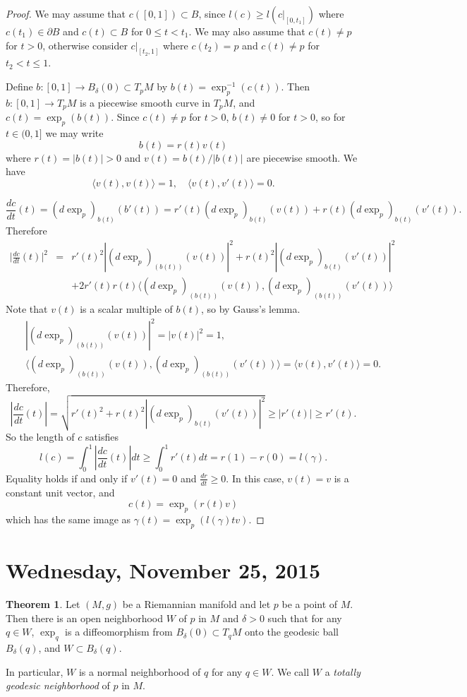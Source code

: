 \documentclass{amsart}
\numberwithin{equation}{section}
\theoremstyle{definition}
\theoremstyle{theorem}
\newtheorem{theorem}[definition]{Theorem}
\begin{document}
\begin{proof}
We may assume that $c([0,1]) \subset B$, since $l(c)\geq l(c|_{[0,t_1]})$ where $c(t_1)\in \partial B$ and $c(t)\subset B$ for $0\leq t<t_1$.
We may also assume that $c(t) \ne p$ for $t > 0$, otherwise consider $c|_{[t_2, 1]}$ where $c(t_2) = p$ and $c(t) \ne p$ for $t_2 < t \le 1$. 

Define $b:[0,1]\to B_\delta(0)\subset T_p M$ by $b(t)=\exp_p^{-1}(c(t))$. Then $b:[0,1]\to T_pM$ is a piecewise smooth curve in $T_pM$,
and $c(t) = \exp_p(b(t))$. Since $c(t)\neq p$ for $t>0$, $b(t)\neq 0$ for $t>0$, so for $t\in (0,1]$ we may write
$$
b(t)= r(t)v(t)
$$
where $r(t)=|b(t)|>0$ and $v(t)=b(t)/|b(t)|$ are piecewise smooth. We have 
$$
\langle v(t), v(t)\rangle =1,\quad \langle v(t),v'(t)\rangle =0. 
$$
 
\[
\frac{dc}{dt}(t) = (d \exp_p)_{b(t)} (b'(t)) = r'(t) (d \exp_p)_{b(t)}(v(t)) + r(t) (d \exp_p)_{b(t)}(v'(t)).
\]
Therefore 
\begin{eqnarray*}
\Big|\frac{dc}{dt}(t)\Big|^2 &=&  r'(t)^2 |(d \exp_p)_{(b(t))}(v(t)) |^2 + r(t)^2 |(d \exp_p)_{b(t)}(v'(t))|^2\\
&& + 2r'(t)r(t) \langle (d \exp_p)_{(b(t))}(v(t)), (d \exp_p)_{(b(t))}(v'(t))\rangle 
\end{eqnarray*}
Note that $v(t)$ is a scalar multiple of $b(t)$, so by Gauss's lemma.
\begin{eqnarray*}
&& |(d \exp_p)_{(b(t))}(v(t)) |^2 = |v(t)|^2 =1,\\
&& \langle (d \exp_p)_{(b(t))}(v(t)), (d \exp_p)_{(b(t))}(v'(t))\rangle =\langle v(t),v'(t)\rangle =0.
\end{eqnarray*}
Therefore,
$$
\left|\frac{dc}{dt}(t)\right| =\sqrt{ r'(t)^2 + r(t)^2 |(d \exp_p)_{b(t)}(v'(t))|^2} \geq |r'(t)| \geq r'(t). 
$$
So the length of $c$ satisfies 
\[
l(c) = \int_0^1 \left|\frac{dc}{dt}(t)\right|dt  \ge \int_0^1r'(t) dt =  r(1) - r(0) = l(\gamma).
\]
Equality holds if and only if $v'(t) = 0$ and $\frac{dr}{dt} \ge0$. In this case, $v(t)=v$ is a constant unit vector, and  
\[
c(t) = \exp_p(r(t)v)
\]
which has the same image as $\gamma(t)=\exp_p(l(\gamma)t v)$. 
\end{proof}




\section{Wednesday, November 25, 2015}

\begin{theorem}
Let $(M,g)$ be a Riemannian manifold and let $p$ be a point of $M$. Then there is an open neighborhood $W$ of $p$ in $M$ and $\delta > 0$ 
such that for any $q \in W$, $\exp_q$ is a diffeomorphism from $B_\delta(0) \subset T_qM$ onto the geodesic ball $B_\delta(q)$,  
and $W \subset B_\delta(q)$. 

In particular, $W$ is a normal neighborhood of $q$ for any $q \in W$. We call $W$ a {\em totally geodesic neighborhood} of $p$ in $M$.
\end{theorem}
\end{document}
